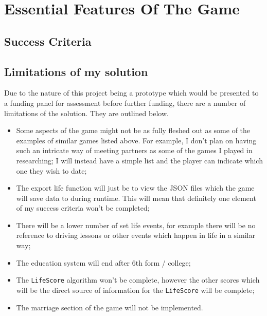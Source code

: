 \section{Essential Features Of The Game}
\subsection{Success Criteria}

\subsection{Limitations of my solution}
Due to the nature of this project being a prototype which would be presented to a funding panel for assessment before further funding, there are a number of limitations of the solution.
They are outlined below.
\begin{itemize}
    \item Some aspects of the game might not be as fully fleshed out as some of the examples of similar games listed above. For example, I don’t plan on having such an intricate way of meeting partners as some of the games I played in researching; I will instead have a simple list and the player can indicate which one they wish to date;
    \item The export life function will just be to view the JSON files which the game will save data to during runtime. This will mean that definitely one element of my success criteria won't be completed;
    \item There will be a lower number of set life events, for example there will be no reference to driving lessons or other events which happen in life in a similar way;
    \item The education system will end after 6th form / college;
    \item The \verb|LifeScore| algorithm won’t be complete, however the other scores which will be the direct source of information for the \verb|LifeScore| will be complete;
    \item The marriage section of the game will not be implemented.
\end{itemize}

